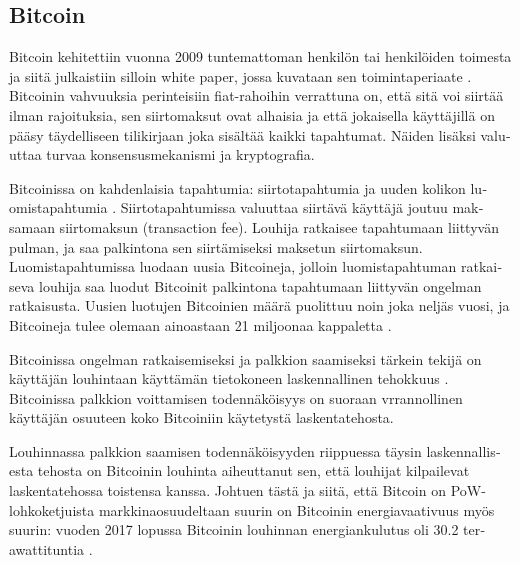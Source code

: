 \subsection{Bitcoin\label{bitcoin}}
\begin{otherlanguage}{english}

Bitcoin kehitettiin vuonna 2009 tuntemattoman henkilön tai henkilöiden toimesta ja siitä julkaistiin silloin white paper, jossa kuvataan sen toimintaperiaate \cite{bitcoin1, satoshibitcoin}. Bitcoinin vahvuuksia perinteisiin fiat-rahoihin verrattuna on, että sitä voi siirtää ilman rajoituksia, sen siirtomaksut ovat alhaisia ja että jokaisella käyttäjillä on pääsy täydelliseen tilikirjaan joka sisältää kaikki tapahtumat. Näiden lisäksi valuuttaa turvaa konsensusmekanismi ja kryptografia.

Bitcoinissa on kahdenlaisia tapahtumia: siirtotapahtumia ja uuden kolikon luomistapahtumia \cite{bitcoin1}. Siirtotapahtumissa valuuttaa siirtävä käyttäjä joutuu maksamaan siirtomaksun (transaction fee). Louhija ratkaisee tapahtumaan liittyvän pulman, ja saa palkintona sen siirtämiseksi maksetun siirtomaksun. Luomistapahtumissa luodaan uusia Bitcoineja, jolloin luomistapahtuman ratkaiseva louhija saa luodut Bitcoinit palkintona tapahtumaan liittyvän ongelman ratkaisusta. Uusien luotujen Bitcoinien määrä puolittuu noin joka neljäs vuosi, ja Bitcoineja tulee olemaan ainoastaan 21 miljoonaa kappaletta \cite{satoshibitcoin}.

Bitcoinissa ongelman ratkaisemiseksi ja palkkion saamiseksi tärkein tekijä on käyttäjän louhintaan käyttämän tietokoneen laskennallinen tehokkuus \cite{bitcoin1}. Bitcoinissa palkkion voittamisen todennäköisyys on suoraan vrrannollinen käyttäjän osuuteen koko Bitcoiniin käytetystä laskentatehosta.

Louhinnassa palkkion saamisen todennäköisyyden riippuessa täysin laskennallisesta tehosta on Bitcoinin louhinta aiheuttanut sen, että louhijat kilpailevat laskentatehossa toistensa kanssa. Johtuen tästä ja siitä, että Bitcoin on PoW-lohkoketjuista markkinaosuudeltaan suurin on Bitcoinin energiavaativuus myös suurin: vuoden 2017 lopussa Bitcoinin louhinnan energiankulutus oli 30.2 terawattituntia \cite{bitcoinenergy1}. 


\end{otherlanguage}